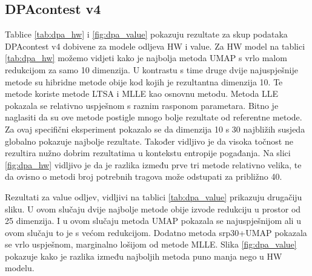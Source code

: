 \documentclass[times, utf8, diplomski]{fer}
\begin{document}
\subsection{DPAcontest v4}
Tablice \ref{tab:dpa_hw} i \ref{fig:dpa_value} pokazuju rezultate za skup podataka DPAcontest v4 dobivene za modele odljeva HW i value. Za HW model na tablici \ref{tab:dpa_hw} možemo vidjeti kako je najbolja metoda UMAP s vrlo malom redukcijom za samo 10 dimenzija. U kontrastu s time druge dvije najuspješnije metode su hibridne metode obije kod kojih je rezultantna dimenzija 10. Te metode koriste metode LTSA i MLLE kao osnovnu metodu. Metoda LLE pokazala se relativno uspješnom s raznim rasponom parametara. Bitno je naglasiti da su ove metode postigle mnogo bolje rezultate od referentne metode. Za ovaj specifični eksperiment pokazalo se da dimenzija 10 s 30 najbližih susjeda globalno pokazuje najbolje rezultate. Također vidljivo je da visoka točnost ne rezultira nužno dobrim rezultatima u kontekstu entropije pogađanja. Na slici \ref{fig:dpa_hw} vidljivo je da je razlika između prve tri metode relativno velika, te da ovisno o metodi broj potrebnih tragova može odstupati za približno 40.

Rezultati za value odljev, vidljivi na tablici \ref{tab:dpa_value} prikazuju drugačiju sliku. U ovom slučaju dvije najbolje metode obije izvode redukciju u prostor od 25 dimenzija. I u ovom slučaju metoda UMAP pokazala se najuspješnijom ali u ovom slučaju to je s većom redukcijom. Dodatno metoda srp30+UMAP pokazala se vrlo uspješnom, marginalno lošijom od metode MLLE.  Slika \ref{fig:dpa_value} pokazuje kako je razlika između najboljih metoda puno manja nego u HW modelu.
\end{document}
